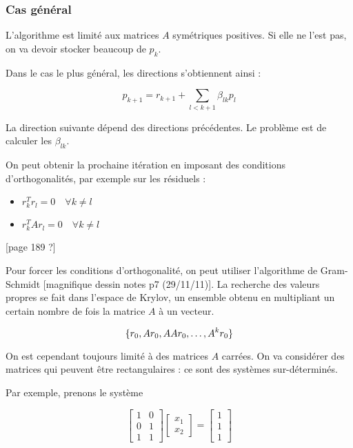 		\subsubsection{Cas général}
		
		L'algorithme est limité aux matrices $A$ symétriques positives. Si elle ne l'est pas, on va devoir stocker beaucoup de $p_k$.
		
		Dans le cas le plus général, les directions s'obtiennent ainsi :
		
		$$p_{k + 1} = r_{k + 1} + \sum_{l < k + 1} \beta_{lk} p_l$$
		
		La direction suivante dépend des directions précédentes.  Le problème est de calculer les $\beta_{lk}$.
		
		On peut obtenir la prochaine itération en imposant des conditions d'orthogonalités, par exemple sur les résiduels :
		
		\begin{itemize}
			\item $r_k^Tr_l = 0 \quad \forall k \neq l$
			\item $r_k^TAr_l = 0 \quad \forall k \neq l$
		\end{itemize}
				
		[page 189 ?]
		
		Pour forcer les conditions d'orthogonalité, on peut utiliser l'algorithme de Gram-Schmidt [magnifique dessin notes p7 (29/11/11)]. La recherche des valeurs propres se fait dans l'espace de Krylov, un ensemble obtenu en multipliant un certain nombre de fois la matrice $A$ à un vecteur.
		
		$$\lbrace r_0, Ar_0, AAr_0, \dots , A^kr_0 \rbrace$$
		
		
		On est cependant toujours limité à des matrices $A$ carrées. On va considérer des matrices qui peuvent être rectangulaires : ce sont des systèmes sur-déterminés.
		
		Par exemple, prenons le système
		
		$$\begin{bmatrix}
1 & 0 \\ 
0 & 1 \\ 
1 & 1
\end{bmatrix} \begin{bmatrix}
x_1 \\ 
x_2
\end{bmatrix} = \begin{bmatrix}
1 \\ 
1 \\ 
1
\end{bmatrix} $$
		
